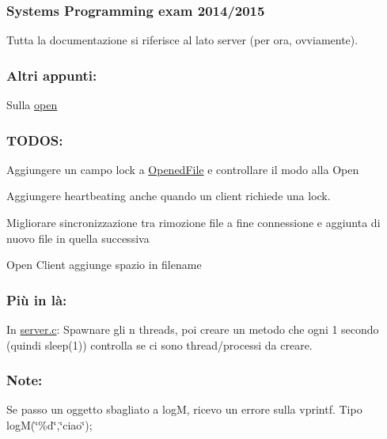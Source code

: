 \subsubsection*{Systems Programming exam 2014/2015}

Tutta la documentazione si riferisce al lato server (per ora, ovviamente). \subsubsection*{Altri appunti\+:}


\begin{DoxyItemize}
\item Sulla \hyperlink{md_OPE}{open}
\end{DoxyItemize}

\subsubsection*{T\+O\+D\+O\+S\+:}


\begin{DoxyItemize}
\item Aggiungere un campo lock a \hyperlink{structOpenedFile}{Opened\+File} e controllare il modo alla Open
\item Aggiungere heartbeating anche quando un client richiede una lock.
\item Migliorare sincronizzazione tra rimozione file a fine connessione e aggiunta di nuovo file in quella successiva
\item Open Client aggiunge spazio in filename
\end{DoxyItemize}

\subsubsection*{Più in là\+:}


\begin{DoxyItemize}
\item In \hyperlink{server_8c}{server.\+c}\+: Spawnare gli n threads, poi creare un metodo che ogni 1 secondo (quindi sleep(1)) controlla se ci sono thread/processi da creare.
\end{DoxyItemize}

\subsubsection*{Note\+:}


\begin{DoxyItemize}
\item Se passo un oggetto sbagliato a log\+M, ricevo un errore sulla vprintf. Tipo log\+M(\char`\"{}\%d\char`\"{},\char`\"{}ciao\char`\"{}); 
\end{DoxyItemize}
